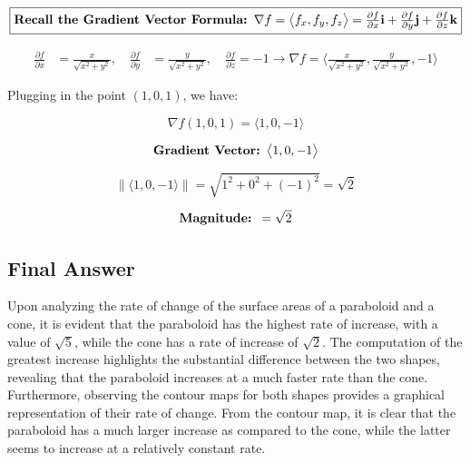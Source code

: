 \documentclass[english]{article}
\begin{document}
$$\fbox{\textbf{Recall the Gradient Vector Formula: $\nabla f = \bigl \langle f_{x}, f_{y}, f_{z} \bigr \rangle = \frac{\partial f}{\partial x} \bold{i} + \frac{\partial f}{\partial y} \bold{j} + \frac{\partial f}{\partial z} \bold{k}$}}$$

\begin{align*}
    \frac{\partial f}{\partial x} &= \frac{x}{\sqrt{x^2 + y^2}}, \quad
    \frac{\partial f}{\partial y} &= \frac{y}{\sqrt{x^2 + y^2}}, \quad
    \frac{\partial f}{\partial z} = -1 
    \longrightarrow \nabla f = \bigl \langle \frac{x}{\sqrt{x^2 + y^2}}, \frac{y}{\sqrt{x^2 + y^2}}, -1 \bigr \rangle
\end{align*}



Plugging in the point $(1,0,1)$, we have:

$$ \nabla f(1,0,1) = \bigl \langle 1, 0, -1 \bigr \rangle $$

\begin{align*}
    \text{\textbf{Gradient Vector: }} \bigl \langle 1, 0, -1 \bigr \rangle
\end{align*}

$$\left\lVert \bigl \langle 1, 0, -1 \bigr\rangle \right\rVert = \sqrt{1^2 + 0^2 + (-1)^2} = \sqrt{2} $$

\begin{align*}
    \text{\textbf{Magnitude: }} = \sqrt{2}
\end{align*}




\subsection{Final Answer}

Upon analyzing the rate of change of the surface areas of a paraboloid and a cone, it is evident that the paraboloid has the highest rate of increase, with a value of $\sqrt{5}$, while the cone has a rate of increase of $\sqrt{2}$. The computation of the greatest increase highlights the substantial difference between the two shapes, revealing that the paraboloid increases at a much faster rate than the cone.
\\

Furthermore, observing the contour maps for both shapes provides a graphical representation of their rate of change. From the contour map, it is clear that the paraboloid has a much larger increase as compared to the cone, while the latter seems to increase at a relatively constant rate.
\end{document}
